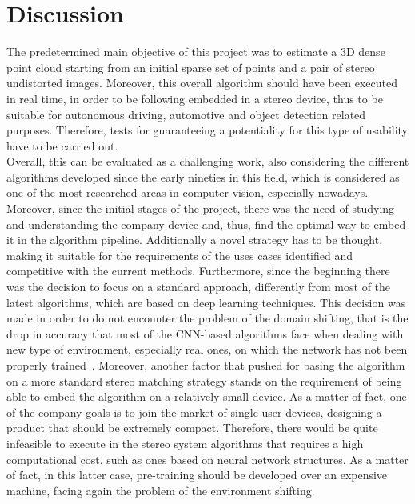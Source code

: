 \chapter{Discussion}
\label{chapter:discussion}

The predetermined main objective of this project was to estimate a 3D dense point cloud starting from an initial sparse set of points and a pair of stereo undistorted images.
Moreover, this overall algorithm should have been executed in real time, in order to be following embedded in a stereo device, thus to be suitable for autonomous driving, automotive and object detection related purposes.
Therefore, tests for guaranteeing a potentiality for this type of usability have to be carried out. \\
Overall, this can be evaluated as a challenging work, also considering the different algorithms developed since the early nineties in this field, which is considered as one of the most researched areas in computer vision, especially nowadays.\\
Moreover, since the initial stages of the project, there was the need of studying and understanding the company device and, thus, find the optimal way to embed it in the algorithm pipeline.
Additionally a novel strategy has to be thought, making it suitable for the requirements of the uses cases identified and competitive with the current methods.
Furthermore, since the beginning there was the decision to focus on a standard approach, differently from most of the latest algorithms, which are based on deep learning techniques.  
This decision was made in order to do not encounter the problem of the domain shifting, that is the drop in accuracy that most of the CNN-based algorithms face when dealing with new type of environment, especially real ones, on which the network has not been properly trained~\cite{Poggi2019}.
Moreover, another factor that pushed for basing the algorithm on a more standard stereo matching strategy stands on the requirement of being able to embed the algorithm on a relatively small device.
As a matter of fact, one of the company goals is to join the market of single-user devices, designing a product that should be extremely compact.
Therefore, there would be quite infeasible to execute in the stereo system algorithms that requires a high computational cost, such as ones based on neural network structures.
As a matter of fact, in this latter case, pre-training should be developed over an expensive machine, facing again the problem of the environment shifting. \\
